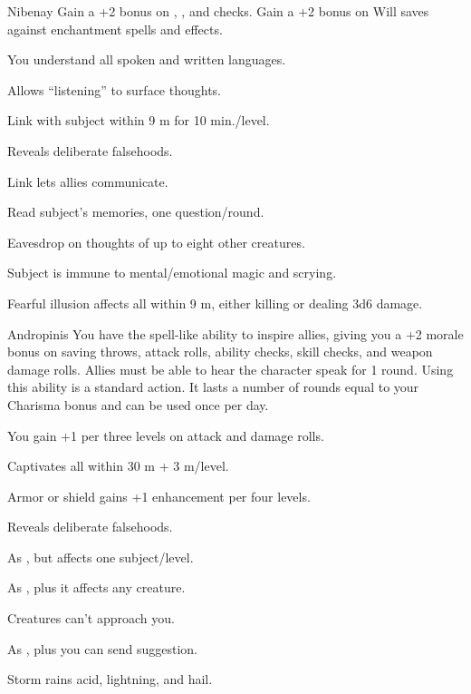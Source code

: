 {Nibenay}
{Gain a +2 bonus on , , and  checks. Gain a +2 bonus on Will saves against enchantment spells and effects.}
{
	\item {} You understand all spoken and written languages.
	\item {} Allows ``listening'' to surface thoughts.
	\item {} Link with subject within 9 m for 10 min./level.
	\item {} Reveals deliberate falsehoods.
	\item {} Link lets allies communicate.
	\item {} Read subject's memories, one question/round.
	\item {} Eavesdrop on thoughts of up to eight other creatures.
	\item {} Subject is immune to mental/emotional magic and scrying.
	\item {} Fearful illusion affects all within 9 m, either killing or dealing 3d6 damage.
}

{Andropinis}
{You have the spell-like ability to inspire allies, giving you a +2 morale bonus on saving throws, attack rolls, ability checks, skill checks, and weapon damage rolls. Allies must be able to hear the character speak for 1 round. Using this ability is a standard action. It lasts a number of rounds equal to your Charisma bonus and can be used once per day.}
{
	\item {} You gain +1 per three levels on attack and damage rolls.
	\item {} Captivates all within 30 m + 3 m/level.
	\item {} Armor or shield gains +1 enhancement per four levels.
	\item {} Reveals deliberate falsehoods.
	\item {} As , but affects one subject/level.
	\item {} As , plus it affects any creature.
	\item {} Creatures can't approach you.
	\item {} As , plus you can send suggestion.
	\item {} Storm rains acid, lightning, and hail.
}

